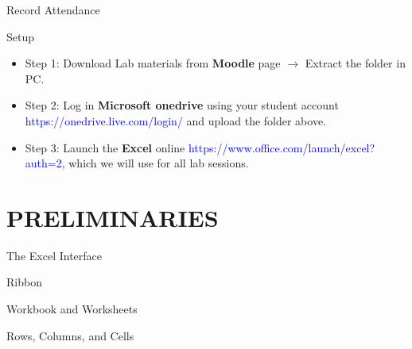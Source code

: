 \documentclass[
  10pt,
  ignorenonframetext,
]{beamer}
\begin{document}
\begin{frame}{Record Attendance}
\protect\hypertarget{record-attendance}{}
\end{frame}

\begin{frame}{Setup}
\protect\hypertarget{setup}{}
\begin{itemize}
\item
  Step 1: Download Lab materials from \textbf{Moodle} page
  \(\rightarrow\) Extract the folder in PC.
\item
  Step 2: Log in \textbf{Microsoft onedrive} using your student account
  \textcolor{blue}{https://onedrive.live.com/login/} and upload the
  folder above.
\item
  Step 3: Launch the \textbf{Excel} online
  \textcolor{blue}{https://www.office.com/launch/excel?auth=2}, which we
  will use for all lab sessions.
\end{itemize}
\end{frame}

\hypertarget{preliminaries}{%
\section{PRELIMINARIES}\label{preliminaries}}

\begin{frame}{The Excel Interface}
\protect\hypertarget{the-excel-interface}{}
\begin{block}{Ribbon}
\protect\hypertarget{ribbon}{}
\end{block}

\begin{block}{Workbook and Worksheets}
\protect\hypertarget{workbook-and-worksheets}{}
\end{block}

\begin{block}{Rows, Columns, and Cells}
\protect\hypertarget{rows-columns-and-cells}{}
\end{block}
\end{frame}
\end{document}
